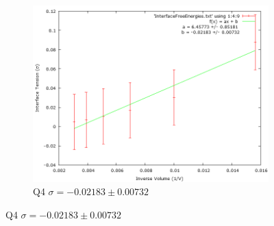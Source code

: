 \begin{figure}[H]
\begin{subfigure}[b]{0.45\textwidth}
   \includegraphics[width=\textwidth]{4-Results/Q4-InterfaceTension.png}
    \caption{Q4 $\sigma = -0.02183 \pm 0.00732$}
\end{subfigure}


\end{figure}
